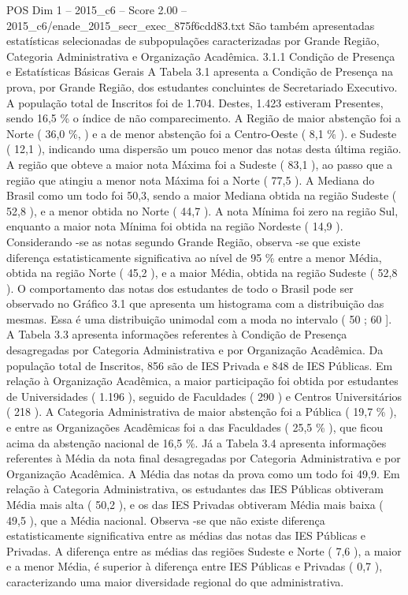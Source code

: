 \begin{textsample}{POS Dim 1 – 2015\_c6 – Score 2.00 – 2015\_c6/enade\_2015\_secr\_exec\_875f6cdd83.txt}
São também apresentadas estatísticas selecionadas de subpopulações caracterizadas por Grande Região, Categoria Administrativa e Organização Acadêmica. 3.1.1 Condição de Presença e Estatísticas Básicas Gerais A Tabela 3.1 apresenta a Condição de Presença na prova, por Grande Região, dos estudantes concluintes de Secretariado Executivo.
A população total de Inscritos foi de 1.704.
Destes, 1.423 estiveram Presentes, sendo 16,5 \% o índice de não comparecimento.
A Região de maior abstenção foi a Norte ( 36,0 \%, ) e a de menor abstenção foi a Centro-Oeste ( 8,1 \% ). e Sudeste ( 12,1 ), indicando uma dispersão um pouco menor das notas desta última região.
A região que obteve a maior nota Máxima foi a Sudeste ( 83,1 ), ao passo que a região que atingiu a menor nota Máxima foi a Norte ( 77,5 ).
A Mediana do Brasil como um todo foi 50,3, sendo a maior Mediana obtida na região Sudeste ( 52,8 ), e a menor obtida no Norte ( 44,7 ).
A nota Mínima foi zero na região Sul, enquanto a maior nota Mínima foi obtida na região Nordeste ( 14,9 ).
Considerando -se as notas segundo Grande Região, observa -se que existe diferença estatisticamente significativa ao nível de 95 \% entre a menor Média, obtida na região Norte ( 45,2 ), e a maior Média, obtida na região Sudeste ( 52,8 ).
O comportamento das notas dos estudantes de todo o Brasil pode ser observado no Gráfico 3.1 que apresenta um histograma com a distribuição das mesmas.
Essa é uma distribuição unimodal com a moda no intervalo ( 50 ; 60 ].
A Tabela 3.3 apresenta informações referentes à Condição de Presença desagregadas por Categoria Administrativa e por Organização Acadêmica.
Da população total de Inscritos, 856 são de IES Privada e 848 de IES Públicas.
Em relação à Organização Acadêmica, a maior participação foi obtida por estudantes de Universidades ( 1.196 ), seguido de Faculdades ( 290 ) e Centros Universitários ( 218 ).
A Categoria Administrativa de maior abstenção foi a Pública ( 19,7 \% ), e entre as Organizações Acadêmicas foi a das Faculdades ( 25,5 \% ), que ficou acima da abstenção nacional de 16,5 \%.
Já a Tabela 3.4 apresenta informações referentes à Média da nota final desagregadas por Categoria Administrativa e por Organização Acadêmica.
A Média das notas da prova como um todo foi 49,9.
Em relação à Categoria Administrativa, os estudantes das IES Públicas obtiveram Média mais alta ( 50,2 ), e os das IES Privadas obtiveram Média mais baixa ( 49,5 ), que a Média nacional.
Observa -se que não existe diferença estatisticamente significativa entre as médias das notas das IES Públicas e Privadas.
A diferença entre as médias das regiões Sudeste e Norte ( 7,6 ), a maior e a menor Média, é superior à diferença entre IES Públicas e Privadas ( 0,7 ), caracterizando uma maior diversidade regional do que administrativa.

\end{textsample}
